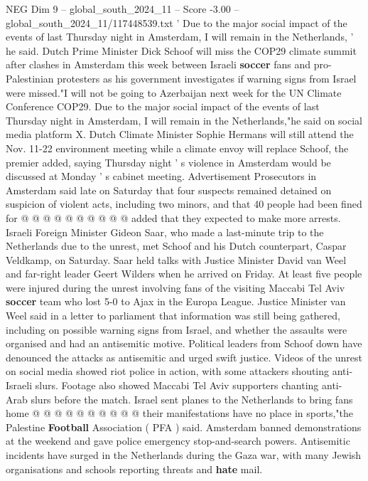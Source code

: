 \begin{textsample}{NEG Dim 9 – global\_south\_2024\_11 – Score -3.00 – global\_south\_2024\_11/117448539.txt}  \label{ex:f9_neg_417}
' Due to the major social impact of the events of last Thursday night in Amsterdam, I will remain in the Netherlands, ' he said.
Dutch Prime Minister Dick Schoof will miss the COP29 climate summit after clashes in Amsterdam this week between Israeli \textbf{soccer} fans and pro-Palestinian protesters as his government investigates if warning signs from Israel were missed."I will not be going to Azerbaijan next week for the UN Climate Conference COP29.
Due to the major social impact of the events of last Thursday night in Amsterdam, I will remain in the Netherlands,"he said on social media platform X.
Dutch Climate Minister Sophie Hermans will still attend the Nov. 11-22 environment meeting while a climate envoy will replace Schoof, the premier added, saying Thursday night ' s violence in Amsterdam would be discussed at Monday ' s cabinet meeting.
Advertisement Prosecutors in Amsterdam said late on Saturday that four suspects remained detained on suspicion of violent acts, including two minors, and that 40 people had been fined for @ @ @ @ @ @ @ @ @ @ added that they expected to make more arrests.
Israeli Foreign Minister Gideon Saar, who made a last-minute trip to the Netherlands due to the unrest, met Schoof and his Dutch counterpart, Caspar Veldkamp, on Saturday.
Saar held talks with Justice Minister David van Weel and far-right leader Geert Wilders when he arrived on Friday.
At least five people were injured during the unrest involving fans of the visiting Maccabi Tel Aviv \textbf{soccer} team who lost 5-0 to Ajax in the Europa League.
Justice Minister van Weel said in a letter to parliament that information was still being gathered, including on possible warning signs from Israel, and whether the assaults were organised and had an antisemitic motive.
Political leaders from Schoof down have denounced the attacks as antisemitic and urged swift justice.
Videos of the unrest on social media showed riot police in action, with some attackers shouting anti-Israeli slurs.
Footage also showed Maccabi Tel Aviv supporters chanting anti-Arab slurs before the match.
Israel sent planes to the Netherlands to bring fans home @ @ @ @ @ @ @ @ @ @ their manifestations have no place in sports,"the Palestine \textbf{Football} Association ( PFA ) said.
Amsterdam banned demonstrations at the weekend and gave police emergency stop-and-search powers.
Antisemitic incidents have surged in the Netherlands during the Gaza war, with many Jewish organisations and schools reporting threats and \textbf{hate} mail.

\end{textsample}
